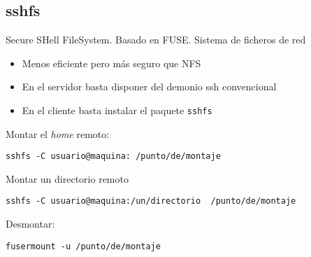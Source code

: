 \documentclass[ucs]{beamer}
\begin{document}
\begin{frame}[fragile]
\subsection{sshfs}
Secure SHell FileSystem. Basado en FUSE. Sistema de ficheros de red
\begin{itemize}	
\item
Menos eficiente pero más seguro que NFS
\item
En el servidor basta disponer del demonio ssh convencional
\item 
En el cliente basta instalar el paquete \verb|sshfs|
\end{itemize}

Montar el \emph{home} remoto:

\verb|sshfs -C usuario@maquina: /punto/de/montaje|


Montar un directorio remoto


\verb|sshfs -C usuario@maquina:/un/directorio  /punto/de/montaje|


Desmontar:

\verb|fusermount -u /punto/de/montaje|


\end{frame}
\end{document}
